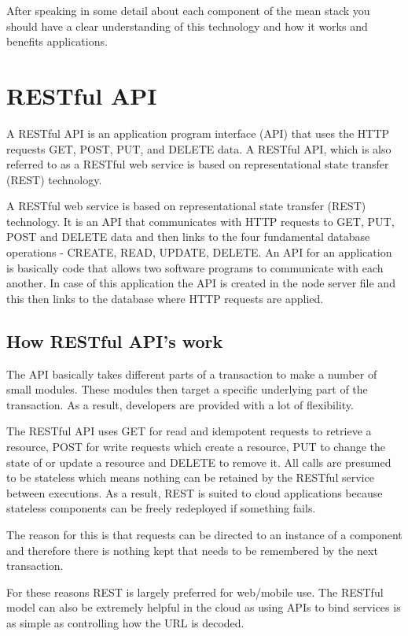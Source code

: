 After speaking in some detail about each component of the mean stack you should have a clear understanding of this technology and how it works and benefits applications.  


\section{RESTful API}
A RESTful API is an application program interface (API) that uses the HTTP requests GET, POST, PUT, and DELETE data. A RESTful API, which is also referred to as a RESTful web service is based on representational state transfer (REST) technology\cite{Restapi}. 

A RESTful web service is based on representational state transfer (REST) technology. It is an API that communicates with HTTP requests to GET, PUT, POST and DELETE data and then links to the four fundamental database operations - CREATE, READ, UPDATE, DELETE. An API for an application is basically code that allows two software programs to communicate with each another. In case of this application the API is created in the node server file and this then links to the database where HTTP requests are applied. 

\subsection {How RESTful API's work}

The API basically takes different parts of a transaction to make a number of small modules. These modules then target a specific underlying part of the transaction. As a result, developers are provided with a lot of flexibility.

The RESTful API uses GET for read and idempotent requests to retrieve a resource,  POST for write requests which create a resource, PUT to change the state of or update a resource and DELETE to remove it. All calls are presumed to be stateless which means nothing can be retained by the RESTful service between executions. As a result,  REST is suited to cloud applications because stateless components can be freely redeployed if something fails. \cite{RESTful}

The reason for this is that requests can be directed to an instance of a component and therefore there is nothing kept that needs to be remembered by the next transaction.

For these reasons REST is largely preferred for web/mobile use. The RESTful model can also be extremely helpful in the cloud as using APIs to bind services is as simple as controlling how the URL is decoded. 

